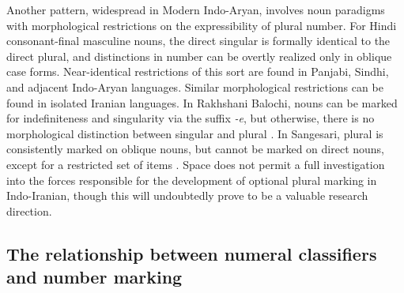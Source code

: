 \documentclass[11pt]{article}
\begin{document}
Another pattern, widespread in Modern Indo-Aryan, involves noun paradigms with morphological restrictions on the expressibility of plural number. For Hindi consonant-final masculine nouns, the direct singular is formally identical to the direct plural, and distinctions in number can be overtly realized only in oblique case forms. Near-identical restrictions of this sort are found in Panjabi, Sindhi, and adjacent Indo-Aryan languages.
Similar morphological restrictions can be found in isolated Iranian languages.
In Rakhshani Balochi, nouns can be marked for indefiniteness and singularity via the suffix {\it -e}, but otherwise, there is no morphological distinction between singular and plural \citep[3ff.]{Barker1969}.
In Sangesari, plural is consistently marked on oblique nouns, but cannot be marked on direct nouns, except for a restricted set of items \citep[70ff.]{AzamiWindfuhr1972}.
Space does not permit a full investigation into the 
forces responsible for the development of optional plural marking in Indo-Iranian, though this will undoubtedly prove to be a valuable research direction. 


\subsection{The relationship between numeral classifiers and number marking}
\end{document}
